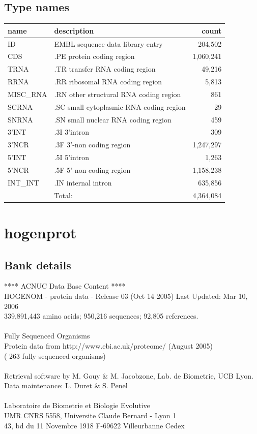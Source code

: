 \documentclass{article}
\begin{document}
\begin{Schunk}
\subsection{Type names}
\noindent\begin{tabular}{llr}
\hline \hline
name & description & count \\
\hline
ID  &  EMBL sequence data library entry  &  204,502 \\
CDS  &  .PE protein coding region  &  1,060,241 \\
TRNA  &  .TR transfer RNA coding region  &  49,216 \\
RRNA  &  .RR ribosomal RNA coding region  &  5,813 \\
MISC\_RNA  &  .RN other structural RNA coding region  &  861 \\
SCRNA  &  .SC small cytoplasmic RNA coding region  &  29 \\
SNRNA  &  .SN small nuclear RNA coding region  &  459 \\
3'INT  &  .3I 3'intron  &  309 \\
3'NCR  &  .3F  3'-non coding region  &  1,247,297 \\
5'INT  &  .5I 5'intron  &  1,263 \\
5'NCR  &  .5F  5'-non coding region  &  1,158,238 \\
INT\_INT  &  .IN  internal intron  &  635,856 \\
\hline
 & Total: & 4,364,084 \\
\hline \hline
\end{tabular}

\section{ hogenprot }
\subsection{Bank details}
               ****     ACNUC Data Base Content      ****                      \\
  HOGENOM - protein data - Release 03 (Oct 14 2005) Last Updated: Mar 10, 2006\\
          339,891,443 amino acids; 950,216 sequences; 92,805 references.\\
                                                                               \\
                        Fully Sequenced Organisms\\
   Protein data from http://www.ebi.ac.uk/proteome/ (August 2005)\\
	            ( 263 fully sequenced organisms)\\
\\
Retrieval software by M. Gouy \& M. Jacobzone, Lab. de Biometrie, UCB Lyon.\\
Data maintenance: L. Duret \& S. Penel\\
\\
Laboratoire de Biometrie et Biologie Evolutive\\
UMR CNRS 5558, Universite Claude Bernard - Lyon 1 \\
43, bd du 11 Novembre 1918 F-69622 Villeurbanne Cedex\\



\end{Schunk}
\end{document}
